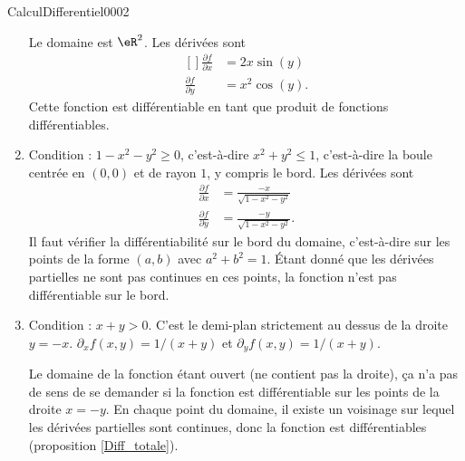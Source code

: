 \begin{corrige}{CalculDifferentiel0002}
\begin{enumerate}
			Le domaine est $\eR^2$. Les dérivées sont
			\begin{equation}
				\begin{aligned}[]
					\frac{ \partial f }{ \partial x }&=2x\sin(y)\\
					\frac{ \partial f }{ \partial y }&=x^2\cos(y).
				\end{aligned}
			\end{equation}
			Cette fonction est différentiable en tant que produit de fonctions différentiables.
		\item
			Condition : $1-x^2-y^2\geq 0$, c'est-à-dire $x^2+y^2\leq 1$, c'est-à-dire la boule centrée en $(0,0)$ et de rayon $1$, y compris le bord. Les dérivées sont
			\begin{subequations}
				\begin{align}
					\frac{ \partial f }{ \partial x }&=\frac{ -x }{ \sqrt{1-x^2-y^2} }\\
					\frac{ \partial f }{ \partial y }&=\frac{ -y }{ \sqrt{1-x^2-y^2} }.
				\end{align}
			\end{subequations}
			Il faut vérifier la différentiabilité sur le bord du domaine, c'est-à-dire sur les points de la forme $(a,b)$ avec $a^2+b^2=1$. Étant donné que les dérivées partielles ne sont pas continues en ces points, la fonction n'est pas différentiable sur le bord.
		\item
			Condition : $x+y>0$. C'est le demi-plan strictement au dessus de la droite $y=-x$. $\partial_xf(x,y)=1/(x+y)$ et $\partial_yf(x,y)=1/(x+y)$.

			Le domaine de la fonction étant ouvert (ne contient pas la droite), ça n'a pas de sens de se demander si la fonction est différentiable sur les points de la droite $x=-y$. En chaque point du domaine, il existe un voisinage sur lequel les dérivées partielles sont continues, donc la fonction est différentiables (proposition \ref{Diff_totale}).
	\end{enumerate}

\end{corrige}
